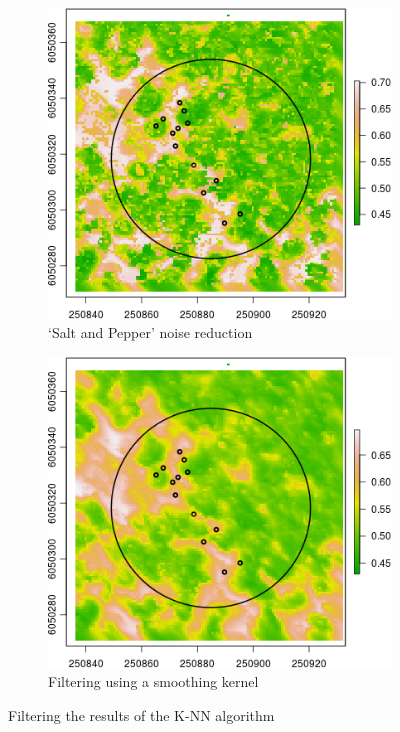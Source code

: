 \documentclass{subfiles}
\begin{document}
	 \begin{figure} [h!]				   
	   \begin{subfigure}[t]{.49\textwidth}
	   \centering
	   \includegraphics[width=\textwidth]{img/dead/c2_knn_SaltPepper}
	   \caption{`Salt and Pepper' noise reduction} 
	   \label{fig:c2_SaltPepper}
	   \end{subfigure}
	   \begin{subfigure}[t]{.49\textwidth}
	   \centering
	   \includegraphics[width=\textwidth]{img/dead/c3_knn_smoothed}
	   \caption{Filtering using a smoothing kernel} 
	   \label{fig:c3_Smoothed}
	   \end{subfigure}
	   \caption{Filtering the results of the K-NN algorithm}  
	   \label{fig:salt_smooth} 
	\end{figure}
\end{document}

